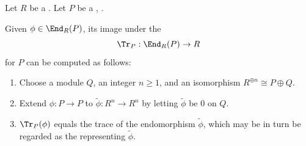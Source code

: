 \begin{proposition} \label{proposition:canonical_trace_of_an_endomorphism_on_a_projective_finitely_generated_module_can_be_computed_via_matrices}
    Let $R$ be a . Let $P$ be a ,  .  

    Given $\phi \in \End_R(P)$, its image under the  
    $$\Tr_P: \End_R(P) \to R$$
    for $P$ can be computed as follows:
    \begin{enumerate}
        \item Choose a module $Q$, an integer $n \geq 1$, and an isomorphism $R^{\oplus n} \cong P \oplus Q$. 
        \item Extend $\phi: P \to P$ to $\widetilde{\phi}: R^n \to R^n$ by letting $\widetilde{\phi}$ be $0$ on $Q$.  
        \item $\Tr_P(\phi)$ equals the trace of the endomorphism $\widetilde{\phi}$, which may be in turn be regarded as the  representing $\widetilde{\phi}$. 
    \end{enumerate}
\end{proposition}